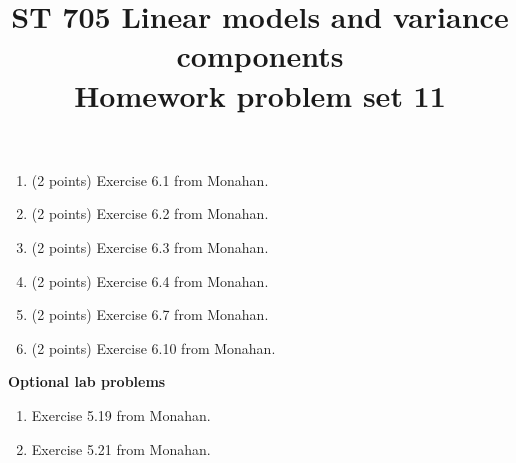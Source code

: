 \documentclass[11pt]{article}
\title{ST 705 Linear models and variance components \\ 
        Homework problem set 11}
\begin{document}
\maketitle

\begin{enumerate}

\item(2 points) Exercise 6.1 from Monahan.

\item(2 points) Exercise 6.2 from Monahan.

\item(2 points) Exercise 6.3 from Monahan.

\item(2 points) Exercise 6.4 from Monahan.

\item(2 points) Exercise 6.7 from Monahan.

\item(2 points) Exercise 6.10 from Monahan.

\end{enumerate}

{\noindent\bf Optional lab problems}

\begin{enumerate}

\item Exercise 5.19 from Monahan.

\item Exercise 5.21 from Monahan.

\end{enumerate}
\end{document}

